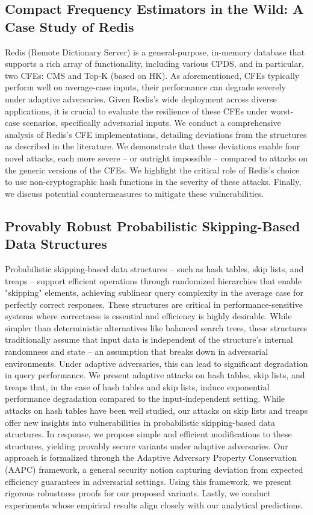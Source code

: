 \subsection{Compact Frequency Estimators in the Wild: A Case Study of Redis} Redis (Remote Dictionary Server) is a general-purpose, in-memory database that supports a rich array of functionality, including various CPDS, and in particular, two CFEs: CMS and Top-K (based on HK). As aforementioned, CFEs typically perform well on average-case inputs, their performance can degrade severely under adaptive adversaries. Given Redis’s wide deployment across diverse applications, it is crucial to evaluate the resilience of these CFEs under worst-case scenarios, specifically adversarial inputs. We conduct a comprehensive analysis of Redis’s CFE implementations, detailing deviations from the structures as described in the literature. We demonstrate that these deviations enable four novel attacks, each more severe -- or outright impossible -- compared to attacks on the generic versions of the CFEs. We highlight the critical role of Redis’s choice to use non-cryptographic hash functions in the severity of these attacks. Finally, we discuss potential countermeasures to mitigate these vulnerabilities.

\subsection{Provably Robust Probabilistic Skipping-Based Data Structures} Probabilistic skipping-based data structures -- such as hash tables, skip lists, and treaps -- support efficient operations through randomized hierarchies that enable "skipping" elements, achieving sublinear query complexity in the average case for perfectly correct responses. These structures are critical in performance-sensitive systems where correctness is essential and efficiency is highly desirable. While simpler than deterministic alternatives like balanced search trees, these structures traditionally assume that input data is independent of the structure’s internal randomness and state -- an assumption that breaks down in adversarial environments. Under adaptive adversaries, this can lead to significant degradation in query performance. We present adaptive attacks on hash tables, skip lists, and treaps that, in the case of hash tables and skip lists, induce exponential performance degradation compared to the input-independent setting. While attacks on hash tables have been well studied, our attacks on skip lists and treaps offer new insights into vulnerabilities in probabilistic skipping-based data structures. In response, we propose simple and efficient modifications to these structures, yielding provably secure variants under adaptive adversaries. Our approach is formalized through the Adaptive Adversary Property Conservation (AAPC) framework, a general security notion capturing deviation from expected efficiency guarantees in adversarial settings. Using this framework, we present rigorous robustness proofs for our proposed variants. Lastly, we conduct experiments whose empirical results align closely with our analytical predictions.

